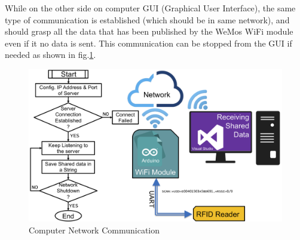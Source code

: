 While on the other side on computer GUI (Graphical User Interface), the same type of communication is established (which should be in same network), and should grasp all the data that has been published by the WeMos WiFi module even if it no data is sent. This communication can be stopped from the GUI if needed as shown in fig.\ref{wifi_pc}.\\
\begin{figure}[!htbp]
	\centering
	\includegraphics[width = 14cm]{Pictures/wifipc}
	\caption{Computer Network Communication}
	\label{wifi_pc}
\end{figure}\\
